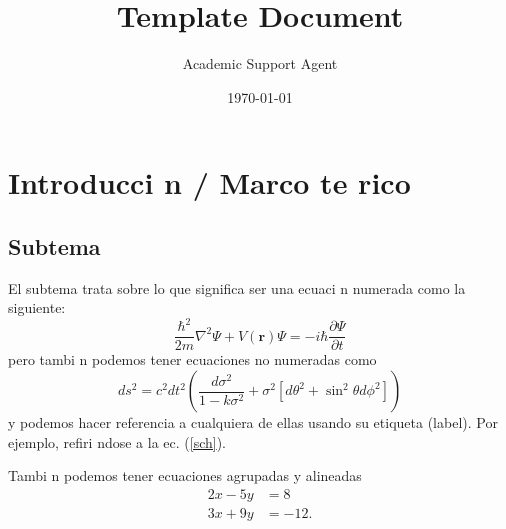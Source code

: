 \documentclass{article}
\title{Template Document}
\author{Academic Support Agent}
\date{\today}
\begin{document}
\maketitle


\newpage

\section{Introducci n / Marco te rico}

\subsection{Subtema}
El subtema trata sobre lo que significa ser una ecuaci n numerada como la siguiente:
\begin{equation}\label{sch}
       \frac{\hbar^2}{2m}\nabla^2\Psi + V(\mathbf{r})\Psi = -i\hbar \frac{\partial\Psi}{\partial t}
\end{equation}
pero tambi n podemos tener ecuaciones no numeradas como
\begin{equation*}
    ds^2 = c^2 dt^2 \left( \frac{d\sigma^2}{1-k\sigma^2} 
    + \sigma^2\left[ d\theta^2 
    + \sin^2\theta d\phi^2 \right] \right)
\end{equation*}
y podemos hacer referencia a cualquiera de ellas usando su etiqueta (label). Por ejemplo, 
refiri ndose a la ec. (\ref{sch}).

Tambi n podemos tener ecuaciones agrupadas y alineadas
\begin{equation}
\begin{aligned} 
2x - 5y &=  8 \\ 
3x + 9y &=  -12.
\end{aligned}
\end{equation}
\end{document}

